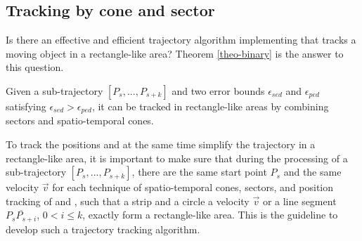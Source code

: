 \subsection{Tracking by cone and sector}

Is there an effective and efficient trajectory algorithm implementing \bed that tracks a moving object in a rectangle-like area? Theorem \ref{theo-binary} is the answer to this question.
\begin{theorem}
	\label{theo-binary}
	Given a sub-trajectory $[P_s,...,P_{s+k}]$ and two error bounds $\epsilon_{sed}$ and $\epsilon_{ped}$ satisfying $\epsilon_{sed} > \epsilon_{ped}$, it can be tracked in rectangle-like areas by combining sectors and spatio-temporal cones.
\end{theorem}

To track the positions and at the same time simplify the trajectory in a rectangle-like area, it is important to make sure that during the processing of a sub-trajectory $[P_s,...,P_{s+k}]$, there are the same start point $P_s$ and the same velocity $\vec{v}$ for each technique of spatio-temporal cones, sectors, and position tracking of \ped and \sed, such that a strip and a circle \wrt a velocity $\vec{v}$ or a line segment $\overline{P_sP_{s+i}}$, $0<i\le k$, exactly form a rectangle-like area. This is the guideline to develop such a trajectory tracking algorithm. 




